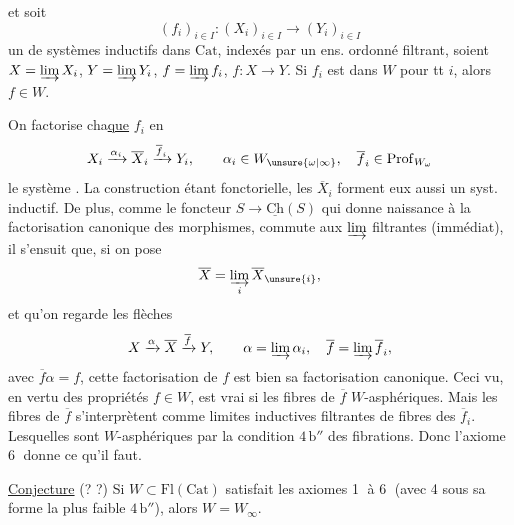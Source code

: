
et soit \[(f_i)_{i\in I}:(X_i)_{i\in I}\longrightarrow(Y_i)_{i\in I}\] un  de systèmes inductifs dans $\mathrm{Cat}$, indexés par un ens. ordonné filtrant, soient $X=\varinjlim X_i$, $Y=\varinjlim Y_i$, $f=\varinjlim f_i$,  $f:X\longrightarrow Y$. Si $f_i$ est dans $W$ pour tt $i$, alors $f\in W$.

On factorise cha\uline{que} $f_i$ en \[X_i\xrightarrow{\alpha_i}\overline X_i\xrightarrow{\overline f_i}Y_i,\qquad \alpha_i\in W_{\unsure{\omega|\infty}},\quad\overline f_i\in\mathrm{Prof}_{W_\omega}\]
  le système . La construction étant fonctorielle, les $\overline X_i$ forment eux aussi un syst. inductif. De plus, comme le  foncteur  $S\longrightarrow\underline{\mathrm{Ch}}(S)$ qui donne naissance  à la factorisation canonique des morphismes, commute aux $\varinjlim$ filtrantes (immédiat), il s'ensuit que, si on pose \[\overline X=\varinjlim_i\overline X_{\unsure{i}},\] et qu'on regarde les flèches \[X\xrightarrow{\alpha}\overline X\xrightarrow{\overline f}Y,\qquad \alpha=\varinjlim\alpha_i,\quad\overline f=\varinjlim\overline f_i,\] avec $\overline f\alpha=f$, cette factorisation de $f$ est bien sa factorisation canonique.  Ceci vu, en vertu des propriétés  $f\in W$,   est vrai si les fibres de $\overline f$   $W$-asphériques. Mais les fibres de $\overline f$ s'interprètent comme limites inductives filtrantes de fibres des $\overline f_i$. Lesquelles sont $W$-asphériques par  la condition $4\,\mathrm b''$ des fibrations. Donc l'axiome \textcircled{6} donne ce qu'il faut.

 \uline{Conjecture} (? ?) Si $W\subset\mathrm{Fl}(\mathrm{Cat})$ satisfait les axiomes \textcircled{1} à \textcircled{6} (avec 4 sous sa forme la plus faible $4\,\mathrm b''$), alors $W=W_\infty$.


